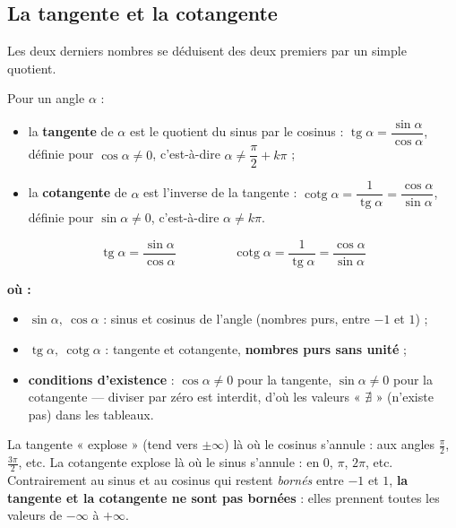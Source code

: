 \documentclass[11pt,a4paper]{article}
\newenvironment{ou}{%
  \par\smallskip\noindent\textbf{où :}\nopagebreak
  \begin{itemize}[leftmargin=1.8em,topsep=2pt,itemsep=1.5pt,parsep=0pt]}%
  {\end{itemize}}
\DeclareMathOperator{\tg}{tg}        %
\DeclareMathOperator{\cotg}{cotg}    %
\begin{document}
\subsection{La tangente et la cotangente}
Les deux derniers nombres se déduisent des deux premiers par un simple quotient.

\begin{definition}
Pour un angle $\alpha$ :
\begin{itemize}[leftmargin=1.5em,topsep=2pt,itemsep=2pt]
  \item la \textbf{tangente} de $\alpha$ est le quotient du sinus par le cosinus :
        $\tg\alpha=\dfrac{\sin\alpha}{\cos\alpha}$, définie pour $\cos\alpha\neq0$, c'est-à-dire
        $\alpha\neq\dfrac{\pi}{2}+k\pi$ ;
  \item la \textbf{cotangente} de $\alpha$ est l'inverse de la tangente :
        $\cotg\alpha=\dfrac{1}{\tg\alpha}=\dfrac{\cos\alpha}{\sin\alpha}$, définie pour
        $\sin\alpha\neq0$, c'est-à-dire $\alpha\neq k\pi$.
\end{itemize}
\end{definition}

\begin{formule}
\[
\boxed{\;\tg\alpha=\frac{\sin\alpha}{\cos\alpha}\;}
\qquad\qquad
\boxed{\;\cotg\alpha=\frac{1}{\tg\alpha}=\frac{\cos\alpha}{\sin\alpha}\;}
\]
\begin{ou}
  \item $\sin\alpha,\ \cos\alpha$ : sinus et cosinus de l'angle (nombres purs, entre $-1$ et $1$) ;
  \item $\tg\alpha,\ \cotg\alpha$ : tangente et cotangente, \textbf{nombres purs sans unité} ;
  \item \textbf{conditions d'existence} : $\cos\alpha\neq0$ pour la tangente, $\sin\alpha\neq0$ pour
        la cotangente --- diviser par zéro est interdit, d'où les valeurs « $\nexists$ » (n'existe pas)
        dans les tableaux.
\end{ou}
\end{formule}

\begin{attention}
La tangente « explose » (tend vers $\pm\infty$) là où le cosinus s'annule : aux angles
$\tfrac{\pi}{2}$, $\tfrac{3\pi}{2}$, etc. La cotangente explose là où le sinus s'annule :
en $0$, $\pi$, $2\pi$, etc. Contrairement au sinus et au cosinus qui restent \emph{bornés} entre
$-1$ et $1$, \textbf{la tangente et la cotangente ne sont pas bornées} : elles prennent toutes les
valeurs de $-\infty$ à $+\infty$.
\end{attention}
\end{document}
